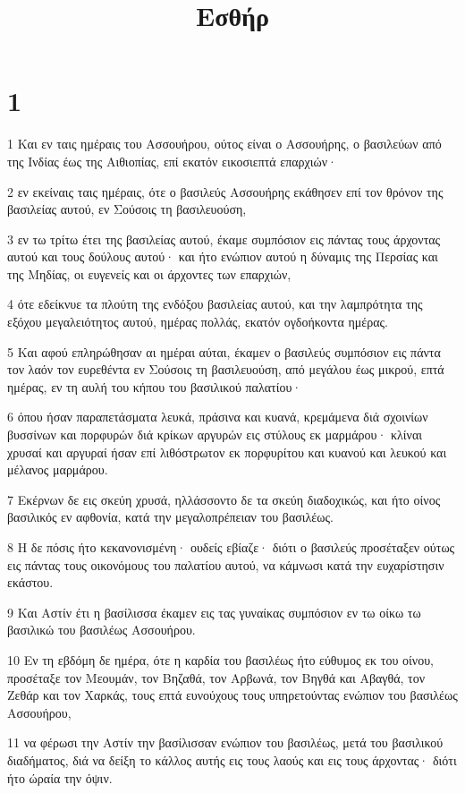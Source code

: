 

\title{Εσθήρ}


\chapter{1}

\par 1 Και εν ταις ημέραις του Ασσουήρου, ούτος είναι ο Ασσουήρης, ο βασιλεύων από της Ινδίας έως της Αιθιοπίας, επί εκατόν εικοσιεπτά επαρχιών·
\par 2 εν εκείναις ταις ημέραις, ότε ο βασιλεύς Ασσουήρης εκάθησεν επί τον θρόνον της βασιλείας αυτού, εν Σούσοις τη βασιλευούση,
\par 3 εν τω τρίτω έτει της βασιλείας αυτού, έκαμε συμπόσιον εις πάντας τους άρχοντας αυτού και τους δούλους αυτού· και ήτο ενώπιον αυτού η δύναμις της Περσίας και της Μηδίας, οι ευγενείς και οι άρχοντες των επαρχιών,
\par 4 ότε εδείκνυε τα πλούτη της ενδόξου βασιλείας αυτού, και την λαμπρότητα της εξόχου μεγαλειότητος αυτού, ημέρας πολλάς, εκατόν ογδοήκοντα ημέρας.
\par 5 Και αφού επληρώθησαν αι ημέραι αύται, έκαμεν ο βασιλεύς συμπόσιον εις πάντα τον λαόν τον ευρεθέντα εν Σούσοις τη βασιλευούση, από μεγάλου έως μικρού, επτά ημέρας, εν τη αυλή του κήπου του βασιλικού παλατίου·
\par 6 όπου ήσαν παραπετάσματα λευκά, πράσινα και κυανά, κρεμάμενα διά σχοινίων βυσσίνων και πορφυρών διά κρίκων αργυρών εις στύλους εκ μαρμάρου· κλίναι χρυσαί και αργυραί ήσαν επί λιθόστρωτον εκ πορφυρίτου και κυανού και λευκού και μέλανος μαρμάρου.
\par 7 Εκέρνων δε εις σκεύη χρυσά, ηλλάσσοντο δε τα σκεύη διαδοχικώς, και ήτο οίνος βασιλικός εν αφθονία, κατά την μεγαλοπρέπειαν του βασιλέως.
\par 8 Η δε πόσις ήτο κεκανονισμένη· ουδείς εβίαζε· διότι ο βασιλεύς προσέταξεν ούτως εις πάντας τους οικονόμους του παλατίου αυτού, να κάμνωσι κατά την ευχαρίστησιν εκάστου.
\par 9 Και Αστίν έτι η βασίλισσα έκαμεν εις τας γυναίκας συμπόσιον εν τω οίκω τω βασιλικώ του βασιλέως Ασσουήρου.
\par 10 Εν τη εβδόμη δε ημέρα, ότε η καρδία του βασιλέως ήτο εύθυμος εκ του οίνου, προσέταξε τον Μεουμάν, τον Βηζαθά, τον Αρβωνά, τον Βηγθά και Αβαγθά, τον Ζεθάρ και τον Χαρκάς, τους επτά ευνούχους τους υπηρετούντας ενώπιον του βασιλέως Ασσουήρου,
\par 11 να φέρωσι την Αστίν την βασίλισσαν ενώπιον του βασιλέως, μετά του βασιλικού διαδήματος, διά να δείξη το κάλλος αυτής εις τους λαούς και εις τους άρχοντας· διότι ήτο ώραία την όψιν.

